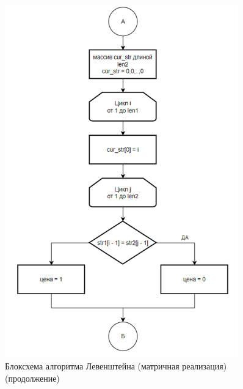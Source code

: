 \begin{figure}[H]
    \centering
    \includegraphics[width=0.9\textwidth]{img/block_1_1_2.png}
    \caption{Блоксхема алгоритма Левенштейна (матричная реализация) (продолжение)}
\end{figure}

